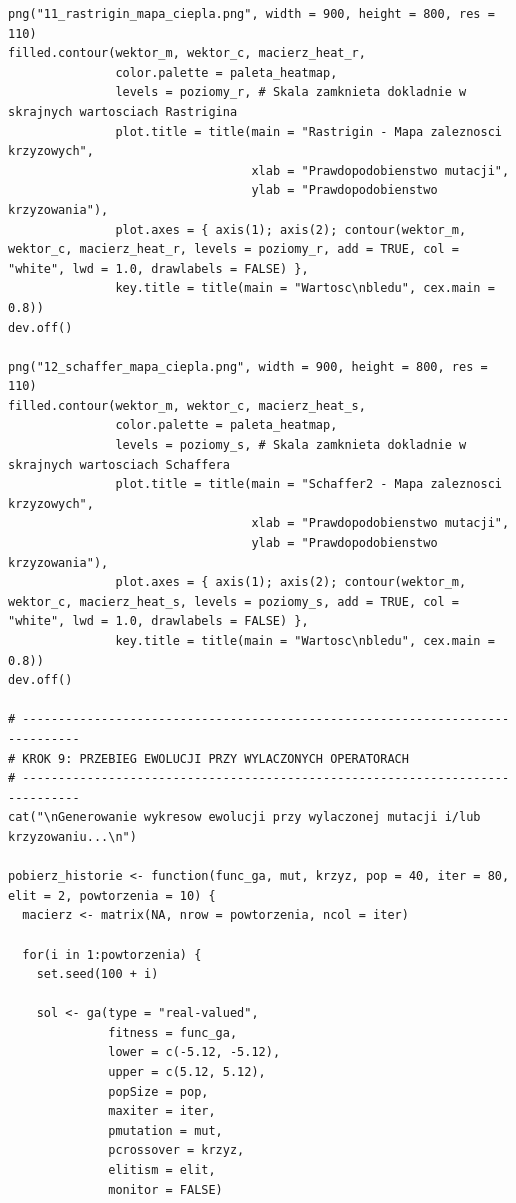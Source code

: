 \documentclass[a4paper,12pt]{article}
\begin{document}
\begin{lstlisting}
png("11_rastrigin_mapa_ciepla.png", width = 900, height = 800, res = 110)
filled.contour(wektor_m, wektor_c, macierz_heat_r, 
               color.palette = paleta_heatmap,
               levels = poziomy_r, # Skala zamknieta dokladnie w skrajnych wartosciach Rastrigina
               plot.title = title(main = "Rastrigin - Mapa zaleznosci krzyzowych",
                                  xlab = "Prawdopodobienstwo mutacji", 
                                  ylab = "Prawdopodobienstwo krzyzowania"),
               plot.axes = { axis(1); axis(2); contour(wektor_m, wektor_c, macierz_heat_r, levels = poziomy_r, add = TRUE, col = "white", lwd = 1.0, drawlabels = FALSE) },
               key.title = title(main = "Wartosc\nbledu", cex.main = 0.8))
dev.off()

png("12_schaffer_mapa_ciepla.png", width = 900, height = 800, res = 110)
filled.contour(wektor_m, wektor_c, macierz_heat_s, 
               color.palette = paleta_heatmap,
               levels = poziomy_s, # Skala zamknieta dokladnie w skrajnych wartosciach Schaffera
               plot.title = title(main = "Schaffer2 - Mapa zaleznosci krzyzowych",
                                  xlab = "Prawdopodobienstwo mutacji", 
                                  ylab = "Prawdopodobienstwo krzyzowania"),
               plot.axes = { axis(1); axis(2); contour(wektor_m, wektor_c, macierz_heat_s, levels = poziomy_s, add = TRUE, col = "white", lwd = 1.0, drawlabels = FALSE) },
               key.title = title(main = "Wartosc\nbledu", cex.main = 0.8))
dev.off()

# ------------------------------------------------------------------------------
# KROK 9: PRZEBIEG EWOLUCJI PRZY WYLACZONYCH OPERATORACH
# ------------------------------------------------------------------------------
cat("\nGenerowanie wykresow ewolucji przy wylaczonej mutacji i/lub krzyzowaniu...\n")

pobierz_historie <- function(func_ga, mut, krzyz, pop = 40, iter = 80, elit = 2, powtorzenia = 10) {
  macierz <- matrix(NA, nrow = powtorzenia, ncol = iter)
  
  for(i in 1:powtorzenia) {
    set.seed(100 + i)
    
    sol <- ga(type = "real-valued",
              fitness = func_ga,
              lower = c(-5.12, -5.12),
              upper = c(5.12, 5.12),
              popSize = pop,
              maxiter = iter,
              pmutation = mut,
              pcrossover = krzyz,
              elitism = elit,
              monitor = FALSE)
    

\end{lstlisting}
\end{document}
